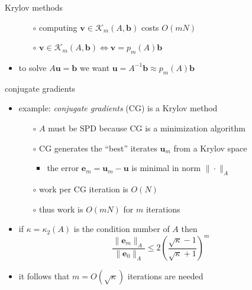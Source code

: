 \documentclass[hide notes,intlimits,usenames,dvipsnames]{beamer}
\newcommand{\bb}{\mathbf{b}}
\newcommand{\be}{\mathbf{e}}
\newcommand{\bu}{\mathbf{u}}
\newcommand{\bv}{\mathbf{v}}
\begin{document}
\begin{frame}{Krylov methods}
\begin{itemize}
    \vspace{2mm}
	\begin{itemize}
	\item[$\circ$] computing $\bv \in \mathcal{K}_m(A,\bb)$ costs $O(mN)$
	\item[$\circ$] $\bv \in \mathcal{K}_m(A,\bb) \iff \bv = p_m(A) \bb$
	\end{itemize}
\item to solve $A\bu=\bb$ we want $\bu = A^{-1}\bb \approx p_m(A) \bb$
\end{itemize}
\end{frame}


\begin{frame}{conjugate gradients}

\begin{itemize}
\item example: \emph{conjugate gradients} (CG) is a Krylov method
	\begin{itemize}
	\item[$\circ$] $A$ must be SPD because CG is a minimization algorithm
	\item[$\circ$] CG generates the ``best'' iterates $\bu_m$ from a Krylov space
		\begin{itemize}
		\item the error $\be_m=\bu_m-\bu$ is minimal in norm $\|\cdot\|_A$
		\end{itemize}
	\item[$\circ$] work per CG iteration is $O(N)$
	\item[$\circ$] thus work is $O(mN)$ for $m$ iterations
	\end{itemize}
\item if $\kappa=\kappa_2(A)$ is the condition number of $A$ then
	$$\frac{\|\be_m\|_A}{\|\be_0\|_A} \le 2 \left(\frac{\sqrt{\kappa}-1}{\sqrt{\kappa}+1}\right)^m$$
\item it follows that $m = O(\sqrt{\kappa})$ iterations are needed
\end{itemize}
\end{frame}
\end{document}
